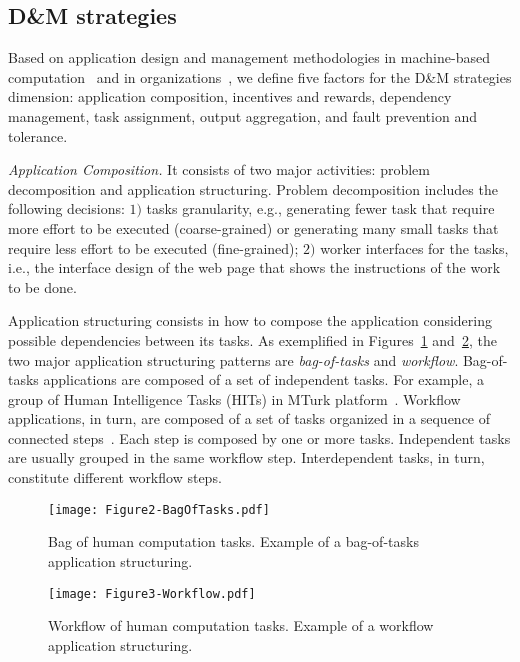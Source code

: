\documentclass[11pt]{bmc_article_s50}
\begin{document}
\subsection{D\&M strategies}

Based on application design and management methodologies in machine-based computation~\cite{Cardoso:2002,Yu:2005,cirne:2003} and in organizations~\cite{Kumar:2002,Kiepuszewski:2000}, we define five factors for the D\&M strategies dimension: application composition, incentives and rewards, dependency management, task assignment, output aggregation, and fault prevention and tolerance.

\textit{Application Composition.} It consists of two major activities: problem decomposition and application structuring. Problem decomposition includes the following decisions: $1)$ tasks granularity, e.g., generating fewer task that require more effort to be executed (coarse-grained) or generating many small tasks that require less effort to be executed (fine-grained); $2)$ worker interfaces for the tasks, i.e., the interface design of the web page that shows the instructions of the work to be done.

Application structuring consists in how to compose the application considering possible dependencies between its tasks. As exemplified in Figures~\ref{fig2} and~\ref{fig3}, the two major application structuring patterns are \textit{bag-of-tasks} and \textit{workflow}. Bag-of-tasks applications are composed of a set of independent tasks. For example, a group of Human Intelligence Tasks (HITs) in MTurk platform~\cite{Little2010}. Workflow applications, in turn, are composed of a set of tasks organized in a sequence of connected steps~\cite{Christoph:2012}. Each step is composed by one or more tasks. Independent tasks are usually grouped in the same workflow step. Interdependent tasks, in turn, constitute different workflow steps.

\begin{figure}[!h]
\centering
\texttt{[image: Figure2-BagOfTasks.pdf]}
\caption{Bag of human computation tasks.
Example of a bag-of-tasks application structuring.}
\label{fig2}
\end{figure}

\begin{figure}[!h]
\centering
\texttt{[image: Figure3-Workflow.pdf]}
\caption{Workflow of human computation tasks.
Example of a workflow application structuring.}
\label{fig3}
\end{figure}
\end{document}
